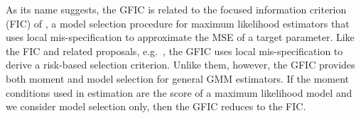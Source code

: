 As its name suggests, the GFIC is related to the focused information criterion (FIC) of \cite{ClaeskensHjort2003}, a model selection procedure for maximum likelihood estimators that uses local mis-specification to approximate the MSE of a target parameter. 
Like the FIC and related proposals, e.g.\ \cite{Schorfheide2005}, the GFIC uses local mis-specification to derive a risk-based selection criterion.
Unlike them, however, the GFIC provides both moment and model selection for general GMM estimators. 
If the moment conditions used in estimation are the score of a maximum likelihood model and we consider model selection only, then the GFIC reduces to the FIC.
